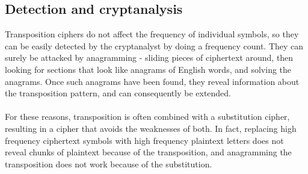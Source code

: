 \documentclass[Lau,binding=0.6cm,oneside]{sapthesis}
\begin{document}
\begin{appendices}
\section{Detection and cryptanalysis}
Transposition ciphers do not affect the frequency of individual symbols, so they can be easily detected by the cryptanalyst by doing a frequency count. They can surely be attacked by anagramming - sliding pieces of ciphertext around, then looking for sections that look like anagrams of English words, and solving the anagrams. Once such anagrams have been found, they reveal information about the transposition pattern, and can consequently be extended.\\\\
For these reasons, transposition is often combined with a substitution cipher, resulting in a cipher that avoids the weaknesses of both. In fact, replacing high frequency ciphertext symbols with high frequency plaintext letters does not reveal chunks of plaintext because of the transposition, and anagramming the transposition does not work because of the substitution.
\end{appendices}	

\backmatter

\printbibliography[heading=bibintoc]

\end{document}
